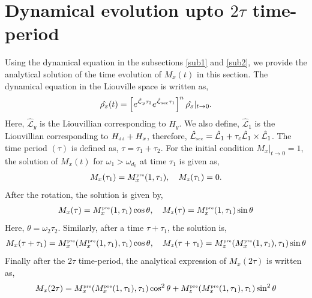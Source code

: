 \documentclass[pra,aps,preprint,floatfix]{revtex4-1}
\newcommand{\rh}{\rho_{\scriptscriptstyle  S}}
\newcommand{\stoo}{\vert_{t\rightarrow 0}}
\begin{document}
\section{Dynamical evolution upto $2 \tau$ time-period}
Using the dynamical equation in the subsections \ref{sub1} and \ref{sub2},  we provide the analytical solution of the 
time evolution of $M_x(t)$ in this section. The dynamical equation in the Liouville space is written as,
\begin{eqnarray}\label{main-eq}
\hat{\rh}(t) =\left[e^{\hat{\mathcal{L}}_y  \tau_2} e^{\hat{\mathcal{L}}_{\scriptscriptstyle \rm sec}  \tau_1}\right]^n \hat{\rh} \stoo.
\end{eqnarray}
Here, $\hat{\mathcal{L}}_y$ is the Liouvillian corresponding to $H_y$. We also define, $\hat{\mathcal{L}}_1$ is the 
Liouvillian corresponding to $H_{\scriptscriptstyle \rm dd} + H_x$, therefore, $\hat{\mathcal{L}}_{\scriptscriptstyle \rm sec} 
= \hat{\mathcal{L}}_1 + \tau_c \hat{\mathcal{L}}_1 \times\hat{\mathcal{L}}_1 $. The time period $(\tau)$ is defined as, 
$\tau = \tau_1 + \tau_2$. For the initial condition $M_x \stoo = 1$, the solution of $M_x(t)$ for 
$\omega_1> \omega_{d_0}$ at time $\tau_1$ is given as, 
\begin{eqnarray}
M_x (\tau_1) = M_x^{\scriptscriptstyle \rm pre}(1, \tau_1),\quad M_z (\tau_1) = 0.
\end{eqnarray}
After the rotation, the solution is given by,
\begin{eqnarray}
M_x (\tau) = M_x^{\scriptscriptstyle \rm pre}(1, \tau_1) \cos\theta, \quad  M_z (\tau) = M_x^{\scriptscriptstyle \rm pre}(1, \tau_1) \sin\theta
\end{eqnarray}
Here, $\theta = \omega_2 \tau_2$. Similarly, after a time $ \tau + \tau_1$, the solution is,
\begin{eqnarray}
M_x (\tau + \tau_1) = M_x^{\scriptscriptstyle \rm pre}(M_x^{\scriptscriptstyle \rm pre}(1, \tau_1), \tau_1) \cos\theta , \quad M_z (\tau + \tau_1) = M_z^{\scriptscriptstyle \rm pre}(M_x^{\scriptscriptstyle \rm pre}(1, \tau_1), \tau_1) \sin \theta
\end{eqnarray}
Finally after the $2\tau$ time-period, the analytical expression of $M_x(2\tau)$ is written as,
\begin{eqnarray}
M_x(2 \tau) = M_x^{\scriptscriptstyle \rm pre}(M_x^{\scriptscriptstyle \rm pre}(1, \tau_1), \tau_1) \cos^2 \theta + M_z^{\scriptscriptstyle \rm pre}(M_x^{\scriptscriptstyle \rm pre}(1, \tau_1), \tau_1) \sin^2 \theta 
\end{eqnarray}
\end{document}
